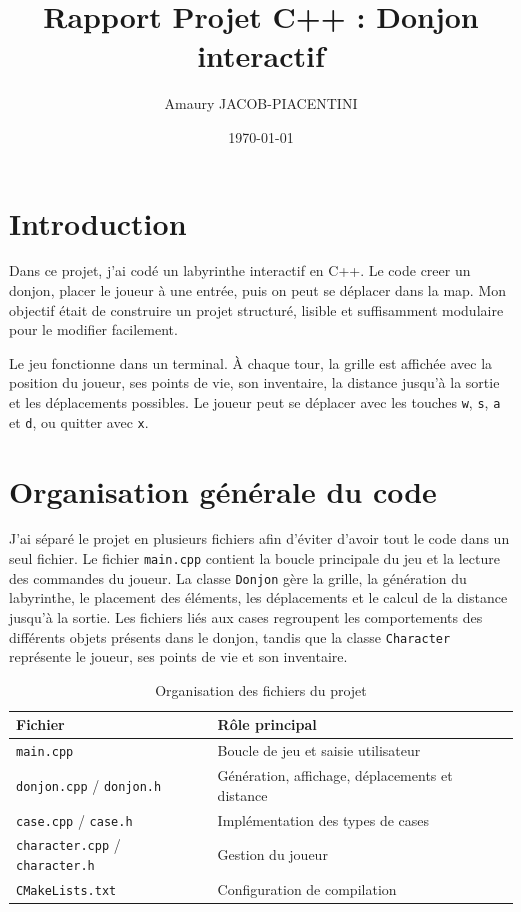 \documentclass{article}
\begin{document}
\title{Rapport Projet C++ : Donjon interactif}
\author{Amaury JACOB-PIACENTINI}
\date{\today}

\maketitle

\section{Introduction}

Dans ce projet, j'ai codé un labyrinthe interactif en C++. Le code creer un donjon, placer le joueur à une entrée, puis on peut se déplacer dans la map. Mon objectif était de construire un projet structuré, lisible et suffisamment modulaire pour le modifier facilement.

Le jeu fonctionne dans un terminal. À chaque tour, la grille est affichée avec la position du joueur, ses points de vie, son inventaire, la distance jusqu'à la sortie et les déplacements possibles. Le joueur peut se déplacer avec les touches \texttt{w}, \texttt{s}, \texttt{a} et \texttt{d}, ou quitter avec \texttt{x}.

\section{Organisation générale du code}

J'ai séparé le projet en plusieurs fichiers afin d'éviter d'avoir tout le code dans un seul fichier. Le fichier \texttt{main.cpp} contient la boucle principale du jeu et la lecture des commandes du joueur. La classe \texttt{Donjon} gère la grille, la génération du labyrinthe, le placement des éléments, les déplacements et le calcul de la distance jusqu'à la sortie. Les fichiers liés aux cases regroupent les comportements des différents objets présents dans le donjon, tandis que la classe \texttt{Character} représente le joueur, ses points de vie et son inventaire.

\begin{table}[h]
\centering
\begin{tabular}{ll}
\toprule
Fichier & Rôle principal \\
\midrule
\texttt{main.cpp} & Boucle de jeu et saisie utilisateur \\
\texttt{donjon.cpp} / \texttt{donjon.h} & Génération, affichage, déplacements et distance \\
\texttt{case.cpp} / \texttt{case.h} & Implémentation des types de cases \\
\texttt{character.cpp} / \texttt{character.h} & Gestion du joueur \\
\texttt{CMakeLists.txt} & Configuration de compilation \\
\bottomrule
\end{tabular}
\caption{Organisation des fichiers du projet}
\end{table}
\end{document}
